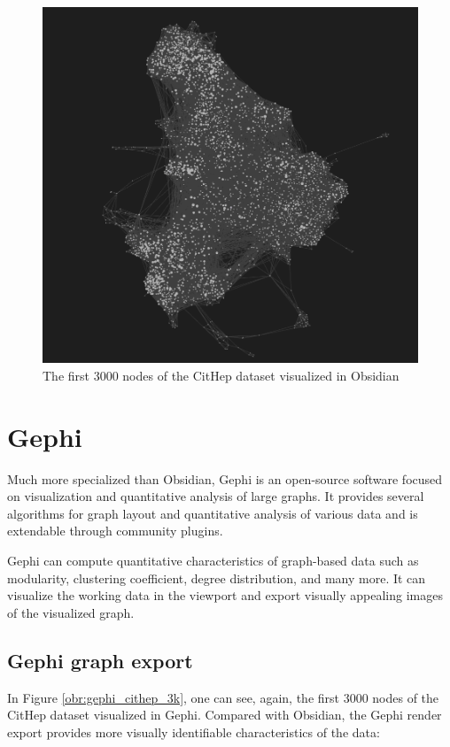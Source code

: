 \begin{figure}[h]\centering
  \includegraphics[width=140mm, keepaspectratio]{img/Obsidian_3000}
  \caption{The first 3000 nodes of the CitHep dataset visualized in Obsidian}
  \label{obr:obsidian_3000}
\end{figure}

\section{Gephi}

Much more specialized than Obsidian, Gephi \cite{gephi_homepage} is an open-source software focused on visualization and quantitative analysis of large graphs.
It provides several algorithms for graph layout and quantitative analysis of various data and is extendable through community plugins.

Gephi can compute quantitative characteristics of graph-based data such as modularity, clustering coefficient, degree distribution, and many more.
It can visualize the working data in the viewport and export visually appealing images of the visualized graph.

\subsection*{Gephi graph export}

In Figure \ref{obr:gephi_cithep_3k}, one can see, again, the first 3000 nodes of the CitHep dataset visualized in Gephi.
Compared with Obsidian, the Gephi render export provides more visually identifiable characteristics of the data:

